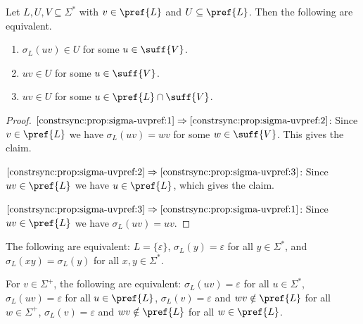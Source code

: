 \begin{proposition} \label{constrsync:prop:sigma-uvpref}
	Let $L, U, V \subseteq \Sigma^*$ with $v \in \pref{L}$
	and $U \subseteq \pref{L}$.	Then the following are equivalent.
	\begin{enumerate}
		\item \label{constrsync:prop:sigma-uvpref:1} $\sigma_L(uv) \in U$ for some $u \in \suff{V}$.
				
		\item \label{constrsync:prop:sigma-uvpref:2} $uv \in U$ for some $u \in \suff{V}$.
		
		\item \label{constrsync:prop:sigma-uvpref:3} $uv \in U$ for some $u \in \pref{L} \cap \suff{V}$.
	\end{enumerate}
\end{proposition}
\begin{proof}
$\ref{constrsync:prop:sigma-uvpref:1}\Rightarrow\ref{constrsync:prop:sigma-uvpref:2}$: Since $v \in \pref{L}$ 
we have $\sigma_L(uv) = wv$ for some $w \in \suff{V}$. This gives the claim.

$\ref{constrsync:prop:sigma-uvpref:2}\Rightarrow\ref{constrsync:prop:sigma-uvpref:3}$: Since $uv \in \pref{L}$ 
we have $u \in \pref{L}$, which gives the claim.

$\ref{constrsync:prop:sigma-uvpref:3}\Rightarrow\ref{constrsync:prop:sigma-uvpref:1}$: Since $uv \in \pref{L}$ 
we have $\sigma_L(uv) = uv$.
\end{proof}

\begin{remark} The following are equivalent: $L = \{\varepsilon\}$, $\sigma_L(y) = \varepsilon$
	for all $y \in \Sigma^*$, and $\sigma_L(xy) = \sigma_L(y)$
	for all $x,y \in \Sigma^*$.
\end{remark}

\begin{remark} For $v \in \Sigma^+$, the following are equivalent:
	$\sigma_L(uv) = \varepsilon$ for all $u \in \Sigma^*$,
	$\sigma_L(uv) = \varepsilon$ for all $u \in \pref{L}$,
	$\sigma_L(v) = \varepsilon$
	and $wv \notin \pref{L}$ for all $w \in \Sigma^+$,
	$\sigma_L(v) = \varepsilon$
	and $wv \notin \pref{L}$ for all $w \in \pref{L}$.	
\end{remark}